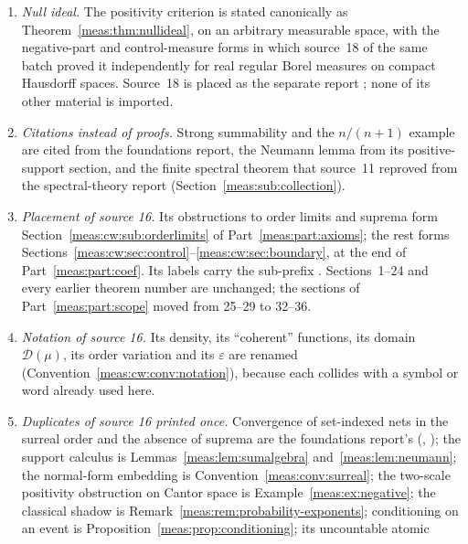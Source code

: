 \documentclass[11pt]{article}
\numberwithin{equation}{section}
\theoremstyle{definition}
\theoremstyle{remark}
\begin{document}
\begin{enumerate}[label=(\arabic*)]
compact metric spaces with a common support; they are re-derived here from
Theorem~\ref{meas:thm:atomic} on countably separated spaces, and they subsume
source~11's transitive-invariance corollary. Source~15's finite-row criterion
at a deterministic baseline is the common-support special case of source~10's
Bernoulli criterion (Remark~\ref{meas:rem:rowfinite}).
\item \emph{Null ideal.} The positivity criterion is stated canonically as
Theorem~\ref{meas:thm:nullideal}, on an arbitrary measurable space, with the
negative-part and control-measure forms in which source~18 of the same batch
proved it independently for real regular Borel measures on compact Hausdorff
spaces. Source~18 is placed as the separate report
; none of its other material is
imported.
\item \emph{Citations instead of proofs.} Strong summability and the
$n/(n+1)$ example are cited from the foundations report, the Neumann lemma from
its positive-support section, and the finite spectral theorem that source~11
reproved from the spectral-theory report (Section~\ref{meas:sub:collection}).
\item \emph{Placement of source 16.} Its obstructions to order limits and
suprema form Section~\ref{meas:cw:sub:orderlimits} of Part~\ref{meas:part:axioms};
the rest forms Sections~\ref{meas:cw:sec:control}--\ref{meas:cw:sec:boundary}, at
the end of Part~\ref{meas:part:coef}. Its labels carry the sub-prefix
. Sections~1--24 and every earlier theorem number are unchanged;
the sections of Part~\ref{meas:part:scope} moved from 25--29 to 32--36.
\item \emph{Notation of source 16.} Its density, its ``coherent'' functions, its
domain $\mathcal D(\mu)$, its order variation and its $\varepsilon$ are renamed
(Convention~\ref{meas:cw:conv:notation}), because each collides with a symbol or
word already used here.
\item \emph{Duplicates of source 16 printed once.} Convergence of set-indexed
nets in the surreal order and the absence of suprema are the foundations
report's (, ); the support
calculus is Lemmas~\ref{meas:lem:sumalgebra} and~\ref{meas:lem:neumann}; the
normal-form embedding is Convention~\ref{meas:conv:surreal}; the two-scale
positivity obstruction on Cantor space is Example~\ref{meas:ex:negative}; the
classical shadow is Remark~\ref{meas:rem:probability-exponents}; conditioning on
an event is Proposition~\ref{meas:prop:conditioning}; its uncountable atomic

\end{enumerate}
\end{document}

